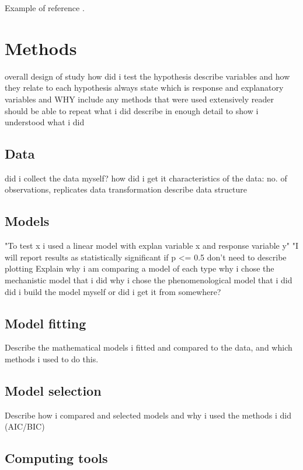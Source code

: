 \documentclass[11pt, titlepage]{article}
\begin{document}
    Example of reference \cite{verhulst1838notice}.


    \section*{Methods}

    overall design of study
    how did i test the hypothesis
    describe variables and how they relate to each hypothesis
    always state which is response and explanatory variables and WHY
        include any methods that were used extensively
    reader should be able to repeat what i did
    describe in enough detail to show i understood what i did

    \subsection*{Data}
        
    did i collect the data myself? how did i get it
    characteristics of the data: no. of observations, replicates
    data transformation
    describe data structure


    \subsection*{Models}
    "To test x i used a linear model with explan variable x and response variable y"
    "I will report results as statistically significant if p <= 0.5
    don't need to describe plotting
    Explain why i am comparing a model of each type
    why i chose the mechanistic model that i did
    why i chose the phenomenological model that i did
    did i build the model myself or did i get it from somewhere?
    \subsection*{Model fitting}
    Describe the mathematical models i fitted and compared to the data, and which methods i used to do this.

    \subsection*{Model selection}

    Describe how i compared and selected models and why i used the methods i did (AIC/BIC)

    \subsection*{Computing tools}
\end{document}
